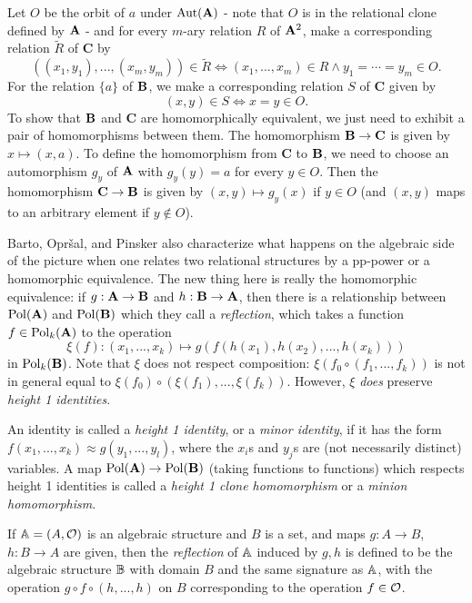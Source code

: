 \documentclass[letterpaper,11pt]{article}
\DeclareMathOperator{\Pol}{Pol}
\DeclareMathOperator{\Aut}{Aut}
\begin{document}
Let $O$ be the orbit of $a$ under $\Aut(\fA)$ - note that $O$ is in the relational clone defined by $\mathbf{A}$ - and for every $m$-ary relation $R$ of $\mathbf{A}^2$, make a corresponding relation $\tilde{R}$ of $\mathbf{C}$ by
\[
((x_1,y_1), ..., (x_m,y_m)) \in \tilde{R} \iff (x_1, ..., x_m) \in R \wedge y_1 = \cdots = y_m \in O.
\]
For the relation $\{a\}$ of $\mathbf{B}$, we make a corresponding relation $S$ of $\mathbf{C}$ given by
\[
(x,y) \in S \iff x = y \in O.
\]
To show that $\mathbf{B}$ and $\mathbf{C}$ are homomorphically equivalent, we just need to exhibit a pair of homomorphisms between them. The homomorphism $\mathbf{B} \rightarrow \mathbf{C}$ is given by $x \mapsto (x,a)$. To define the homomorphism from $\mathbf{C}$ to $\mathbf{B}$, we need to choose an automorphism $g_y$ of $\mathbf{A}$ with $g_y(y) = a$ for every $y \in O$. Then the homomorphism $\mathbf{C} \rightarrow \mathbf{B}$ is given by $(x,y) \mapsto g_y(x)$ if $y \in O$ (and $(x,y)$ maps to an arbitrary element if $y \not\in O$).

Barto, Opr{\v{s}}al, and Pinsker \cite{barto-reflections} also characterize what happens on the algebraic side of the picture when one relates two relational structures by a pp-power or a homomorphic equivalence. The new thing here is really the homomorphic equivalence: if $g : \mathbf{A} \rightarrow \mathbf{B}$ and $h : \mathbf{B} \rightarrow \mathbf{A}$, then there is a relationship between $\Pol(\fA)$ and $\Pol(\fB)$ which they call a \emph{reflection}, which takes a function $f \in \Pol_k(\fA)$ to the operation
\[
\xi(f) : (x_1, ..., x_k) \mapsto g(f(h(x_1), h(x_2), ..., h(x_k)))
\]
in $\Pol_k(\fB)$. Note that $\xi$ does not respect composition: $\xi(f_0 \circ (f_1, ..., f_k))$ is not in general equal to $\xi(f_0)\circ (\xi(f_1), ..., \xi(f_k))$. However, $\xi$ \emph{does} preserve \emph{height 1 identities}.

\begin{defn} An identity is called a \emph{height 1 identity}, or a \emph{minor identity}, if it has the form $f(x_1, ..., x_k) \approx g(y_1, ..., y_l)$, where the $x_i$s and $y_j$s are (not necessarily distinct) variables. A map $\Pol(\fA) \rightarrow \Pol(\fB)$ (taking functions to functions) which respects height 1 identities is called a \emph{height 1 clone homomorphism} or a \emph{minion homomorphism}.
\end{defn}

\begin{defn} If $\mathbb{A} = (A, \mathcal{O})$ is an algebraic structure and $B$ is a set, and maps $g : A \rightarrow B$, $h : B \rightarrow A$ are given, then the \emph{reflection} of $\mathbb{A}$ induced by $g,h$ is defined to be the algebraic structure $\mathbb{B}$ with domain $B$ and the same signature as $\mathbb{A}$, with the operation $g\circ f \circ (h, ..., h)$ on $B$ corresponding to the operation $f \in \mathcal{O}$.
\end{defn}
\end{document}
